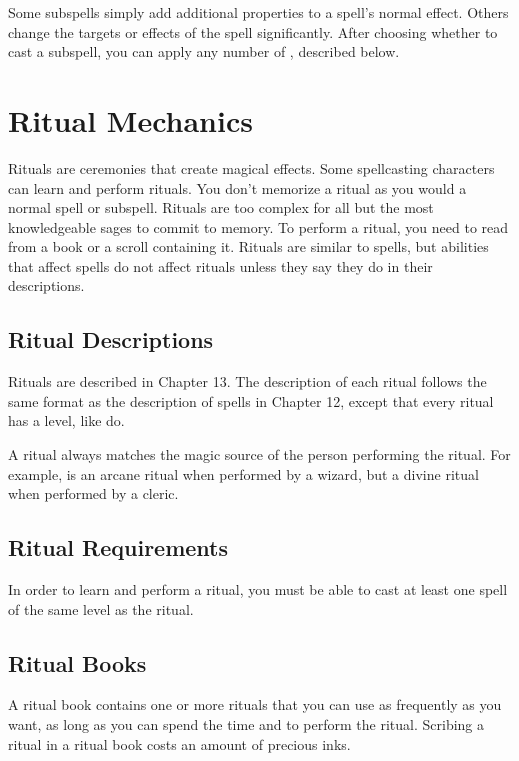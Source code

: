         Some subspells simply add additional properties to a spell's normal effect.
        Others change the targets or effects of the spell significantly.
        After choosing whether to cast a subspell, you can apply any number of , described below.

\section{Ritual Mechanics}
    Rituals are ceremonies that create magical effects.
    Some spellcasting characters can learn and perform rituals.
    You don't memorize a ritual as you would a normal spell or subspell.
    Rituals are too complex for all but the most knowledgeable sages to commit to memory.
    To perform a ritual, you need to read from a book or a scroll containing it.
    Rituals are similar to spells, but abilities that affect spells do not affect rituals unless they say they do in their descriptions.

    \subsection{Ritual Descriptions}
        Rituals are described in Chapter 13.
        The description of each ritual follows the same format as the description of spells in Chapter 12, except that every ritual has a level, like  do.

        A ritual always matches the magic source of the person performing the ritual.
        For example,  is an arcane ritual when performed by a wizard, but a divine ritual when performed by a cleric.

    \subsection{Ritual Requirements}
        In order to learn and perform a ritual, you must be able to cast at least one spell of the same level as the ritual.

    \subsection{Ritual Books}
        A ritual book contains one or more rituals that you can use as frequently as you want, as long as you can spend the time and  to perform the ritual.
        Scribing a ritual in a ritual book costs an amount of precious inks.

